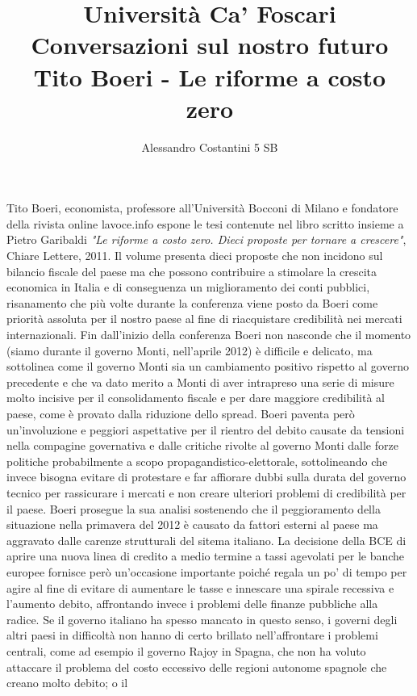 \documentclass[11pt]{article}
\title{Università Ca' Foscari\\Conversazioni sul nostro futuro\\Tito Boeri - Le riforme a costo zero}
\author{Alessandro Costantini 5 SB}
\begin{document}
\maketitle

Tito Boeri, economista, professore all'Università Bocconi di Milano e fondatore della rivista online lavoce.info
espone le tesi contenute nel libro scritto insieme a Pietro Garibaldi 
\textit{"Le riforme a costo zero. Dieci proposte per tornare a crescere"}, Chiare Lettere, 2011.
Il volume presenta dieci proposte che non incidono sul bilancio fiscale del paese ma che
possono contribuire a stimolare la crescita economica in Italia e di conseguenza un miglioramento dei conti pubblici,
risanamento che più volte durante la conferenza viene posto da Boeri come priorità assoluta per il nostro paese
al fine di riacquistare credibilità nei mercati internazionali.
Fin dall'inizio della conferenza Boeri non nasconde che il momento (siamo durante il governo Monti, nell'aprile 2012)
è difficile e delicato, ma sottolinea come il governo Monti sia un
cambiamento positivo rispetto al governo precedente e che va dato merito a Monti di aver intrapreso una serie 
di misure molto incisive per il consolidamento fiscale e per dare maggiore credibilità al paese, come è provato
dalla riduzione dello spread.
Boeri paventa però un'involuzione e peggiori aspettative per il rientro del debito causate da tensioni
nella compagine governativa e dalle critiche rivolte al governo Monti dalle forze politiche
probabilmente a scopo propagandistico-elettorale, sottolineando che invece bisogna evitare di
protestare e far affiorare dubbi sulla durata del governo tecnico per rassicurare i mercati
e non creare ulteriori problemi di credibilità per il paese.
Boeri prosegue la sua analisi sostenendo che il peggioramento della situazione nella primavera del 2012 
è causato da fattori esterni al paese ma aggravato dalle carenze strutturali del sitema
italiano.
La decisione della BCE di aprire una nuova linea di credito a medio termine a tassi
agevolati per le banche europee fornisce però un'occasione importante poiché regala un po' di tempo
per agire al fine di evitare di aumentare le tasse e innescare una spirale recessiva
e l'aumento debito, affrontando invece i problemi delle finanze pubbliche alla radice.
Se il governo italiano ha spesso mancato in questo senso, i governi degli altri paesi in difficoltà non hanno 
di certo brillato nell'affrontare i problemi centrali, come ad esempio il governo Rajoy in Spagna, che non ha 
voluto attaccare il problema del costo eccessivo delle regioni autonome spagnole che creano molto debito; o il
\end{document}
